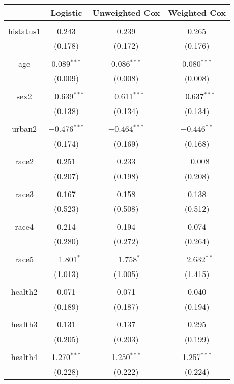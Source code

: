 \documentclass{article}
\begin{document}
\singlespacing
\begin{longtable}{cccc}
\\[-1.8ex] & Logistic & Unweighted Cox & Weighted Cox\\ 
\hline \\[-1.8ex] 
 histatus1 & 0.243 & 0.239 & 0.265 \\ 
  & (0.178) & (0.172) & (0.176) \\ 
  & & & \\ 
 age & 0.089$^{***}$ & 0.086$^{***}$ & 0.080$^{***}$ \\ 
  & (0.009) & (0.008) & (0.008) \\ 
  & & & \\ 
 sex2 & $-$0.639$^{***}$ & $-$0.611$^{***}$ & $-$0.637$^{***}$ \\ 
  & (0.138) & (0.134) & (0.134) \\ 
  & & & \\ 
 urban2 & $-$0.476$^{***}$ & $-$0.464$^{***}$ & $-$0.446$^{**}$ \\ 
  & (0.174) & (0.169) & (0.168) \\ 
  & & & \\ 
 race2 & 0.251 & 0.233 & $-$0.008 \\ 
  & (0.207) & (0.198) & (0.208) \\ 
  & & & \\ 
 race3 & 0.167 & 0.158 & 0.138 \\ 
  & (0.523) & (0.508) & (0.512) \\ 
  & & & \\ 
 race4 & 0.214 & 0.194 & 0.074 \\ 
  & (0.280) & (0.272) & (0.264) \\ 
  & & & \\ 
 race5 & $-$1.801$^{*}$ & $-$1.758$^{*}$ & $-$2.632$^{**}$ \\ 
  & (1.013) & (1.005) & (1.415) \\ 
  & & & \\ 
 health2 & 0.071 & 0.071 & 0.040 \\ 
  & (0.189) & (0.187) & (0.194) \\ 
  & & & \\ 
 health3 & 0.131 & 0.137 & 0.295 \\ 
  & (0.205) & (0.203) & (0.199) \\ 
  & & & \\ 
 health4 & 1.270$^{***}$ & 1.250$^{***}$ & 1.257$^{***}$ \\ 
  & (0.228) & (0.222) & (0.224) \\ 

\end{longtable}
\end{document}
